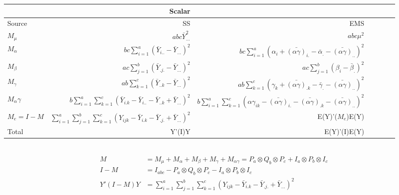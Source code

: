 \begin{itemize}
\begin{tabular}{l r r r r r r }
& Scalar & & & \\\hline
Source & SS & EMS  \\\hline
$M_\mu$ &  $abc\bar{Y}^2_{...}$ & $abc\mu^2$  \\
$M_\alpha$	&  $bc\sum_{i=1}^{a}(\bar{Y}_{i..}- \bar{Y}_{...})^2$ & $bc\sum_{i=1}^{a}(\alpha_i + \bar{(\alpha\gamma)}_{i.}- \bar{\alpha}_{.} - \bar{(\alpha\gamma)}_{..})^2$ \\
$M_\beta$	&  $ac\sum_{j=1}^{b}(\bar{Y}_{.j.}- \bar{Y}_{...})^2$ & $ac\sum_{j=1}^{b}(\beta_i - \bar{\beta}_{.})^2$ \\
$M_\gamma$	& $ab\sum_{k=1}^{c}(\bar{Y}_{..k}- \bar{Y}_{...})^2$ & $ab\sum_{k=1}^{c}(\gamma_k + \bar{(\alpha\gamma)}_{.k}- \bar{\gamma}_{.} - \bar{(\alpha\gamma)}_{..})^2$ \\
$M_\alpha\gamma$	& $b\sum_{i=1}^{a}\sum_{k=1}^{c}(\bar{Y}_{i.k}- \bar{Y}_{i..}- \bar{Y}_{..k} + \bar{Y}_{...})^2$ & $b\sum_{i=1}^{a}\sum_{k=1}^{c}(\alpha\gamma_{ik} - \bar{(\alpha\gamma)}_{i.} - \bar{(\alpha\gamma)}_{.k} - \bar{(\alpha\gamma)}_{..})^2$ \\
$M_e = I-M$	& $\sum_{i=1}^{a}\sum_{j=1}^{b}\sum_{k=1}^{c}(Y_{ijk}-\bar{Y}_{i.k} -\bar{Y}_{.j.}  +\bar{Y}_{...})^2$ & E(Y)'($M_e$)E(Y) \\
Total	& Y'(I)Y & E(Y)'(I)E(Y) \\
\hline
\end{tabular}\\

\begin{align*}
    M &= M_{\mu}+M_{\alpha} + M_{\beta} + M_{\gamma} + M_{\alpha\gamma} = P_a \otimes Q_b \otimes P_c + I_a \otimes P_b \otimes I_c\\
    I-M &= I_{abc}- P_a \otimes Q_b \otimes P_c - I_a \otimes P_b \otimes I_c \\
    Y'(I-M)Y & = \sum_{i=1}^{a}\sum_{j=1}^{b}\sum_{k=1}^{c}(Y_{ijk}-\bar{Y}_{i.k} -\bar{Y}_{.j.}  +\bar{Y}_{...})^2
\end{align*}
\end{itemize}
